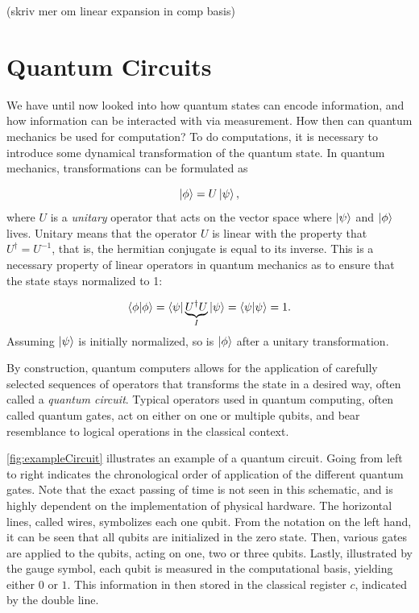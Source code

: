 (skriv mer om linear expansion in comp basis)

\section{Quantum Circuits}\label{sec:QuantumCircuits}
We have until now looked into how quantum states can encode information, and how information can be interacted with via measurement. How then can quantum mechanics be used for computation? To do computations, it is necessary to introduce some dynamical transformation of the quantum state. In quantum mechanics, transformations can be formulated as 

\begin{equation}\label{eq:UnitaryEvolution}
 \ket{\phi} = U\ket{\psi},
\end{equation}
where $U$ is a \emph{unitary} operator that acts on the vector space where $\ket{\psi}$ and $\ket{\phi}$ lives. Unitary means that the operator $U$ is linear with the property that $U^{\dagger} = U^{-1}$, that is, the hermitian conjugate is equal to its inverse. This is a necessary property of linear operators in quantum mechanics as to ensure that the state stays normalized to 1:

\begin{equation}\label{eq:UnitaryEvolution}
 \braket{\phi}{\phi} = \bra{\psi}\underset{I}{\underbrace{U^{\dagger}U}}\ket{\psi} = \bra{\psi}\ket{\psi} =1.
\end{equation}
Assuming $\ket{\psi}$ is initially normalized, so is $\ket{\phi}$ after a unitary transformation.

By construction, quantum computers allows for the application of carefully selected sequences of operators that transforms the state in a desired way, often called a \emph{quantum circuit}. Typical operators used in quantum computing, often called quantum gates, act on either on one or multiple qubits, and bear resemblance to logical operations in the classical context. 

\autoref{fig:exampleCircuit} illustrates an example of a quantum circuit. Going from left to right indicates the chronological order of application of the different quantum gates. Note that the exact passing of time is not seen in this schematic, and is highly dependent on the implementation of physical hardware. The horizontal lines, called wires, symbolizes each one qubit. From the notation on the left hand, it can be seen that all qubits are initialized in the zero state. Then, various gates are applied to the qubits, acting on one, two or three qubits. Lastly, illustrated by the gauge symbol, each qubit is measured in the computational basis, yielding either $0$ or $1$. This information in then stored in the classical register $c$, indicated by the double line. 

